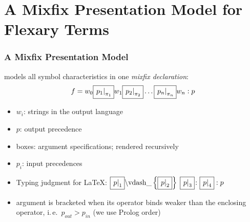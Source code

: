 \documentclass[pdftex,xcolor=svgnames]{beamer}
\newcommand{\ExprColor}[1]{\textcolor[RGB]{38,134,102}{#1}}%
\def\imarg#1#2{\fbox{\ensuremath{\left.#1\right|_{#2}}}}
\begin{document}
\section[Flexary Mixfix Presentation]{A Mixfix Presentation Model for Flexary Terms}
\label{sec:mixfix}

\begin{frame}
  \frametitle{A Mixfix Presentation Model}
  {\isabelle} models all symbol characteristics in one \ExprColor{\emph{mixfix
    declaration}}:
  \[f=w_0\imarg{p_1}{\pi_1}w_1\imarg{p_2}{\pi_2}\ldots\imarg{p_n}{\pi_n}w_n:p\]
  \begin{itemize}
  \item $w_i$: strings in the output language
  \item $p$: output precedence
  \item boxes: argument specifications; rendered recursively
  \item $p_i$: input precedences
  \item Typing judgment for \LaTeX:
    $\imarg{p}{1}\text{\ensuremath{\backslash}vdash\_}\left\{\imarg{p}{2}\right\}\;\imarg{p}{3}\colon\imarg{p}{4}:p$
  \item argument is bracketed when its operator binds weaker than the enclosing
    operator, i.\,e.\ $p_{out}>p_{in}$ (we use Prolog order)
  \end{itemize}
\end{frame}
\end{document}
